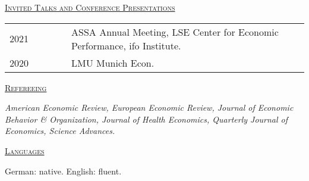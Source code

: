 \documentclass[letterpaper,11pt]{article}
\begin{document}
\bigskip
 
\underline {\textsc{Invited Talks and Conference Presentations}}

\begin{tabular}{@{}l@{}cl@{}cl}
2021 & \ \ \ \ \ & ASSA Annual Meeting, LSE Center for Economic Performance, ifo Institute. \\
2020 & \ \ \ \ \ & LMU Munich Econ. \\
\end{tabular}

\bigskip
 
\underline {\textsc{Refereeing}}

\textit{American Economic Review, European Economic Review, Journal of Economic Behavior \& Organization, Journal of Health Economics, Quarterly Journal of Economics, Science Advances.}

\bigskip
 
\underline {\textsc{Languages}}

German: native. English: fluent.
\end{document}

